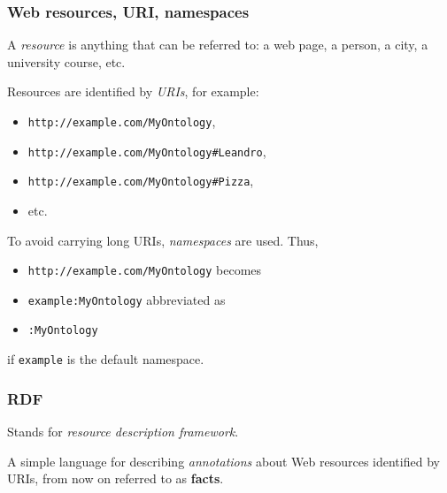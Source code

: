 \documentclass{beamer}
\begin{document}
\begin{frame}
  \frametitle{Web resources, URI, namespaces}

  A \textit{resource} is anything that can be referred to: a web page, a
  person, a city, a university course, etc.

  \pause

  \medskip

  Resources are identified by \textit{URIs}, for example:

  \begin{itemize}
    \item \texttt{http://example.com/MyOntology},
    \item \texttt{http://example.com/MyOntology\#Leandro},
    \item \texttt{http://example.com/MyOntology\#Pizza},
    \item etc.
  \end{itemize}

  \pause

  To avoid carrying long URIs, \textit{namespaces} are used. \pause Thus,

  \pause

  \begin{itemize}
    \item \texttt{http://example.com/MyOntology} \pause \hfill becomes

    \pause

    \item \texttt{example:MyOntology} \pause \hfill abbreviated as

    \pause

    \item \texttt{:MyOntology}
  \end{itemize}

  \pause

  if \texttt{example} is the default namespace.
\end{frame}

\begin{frame}
  \frametitle{RDF}

  Stands for \textit{resource description framework}.

  \medskip

  A simple language for describing \textit{annotations} about Web resources
  identified by URIs, from now on referred to as \textbf{facts}.
\end{frame}
\end{document}
